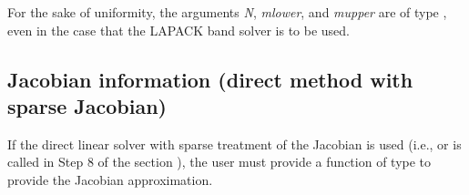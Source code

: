 \documentclass[letterpaper,10pt,english]{sphinxmanual}
\begin{document}
\begin{fulllineitems}
For the sake of uniformity, the arguments \emph{N}, \emph{mlower}, and
\emph{mupper} are of type , even in the case that the
LAPACK band solver is to be used.

\end{fulllineitems}



\subsection{Jacobian information (direct method with sparse Jacobian)}
\label{c_interface/User_supplied:cinterface-sparsejacobianfn}\label{c_interface/User_supplied:jacobian-information-direct-method-with-sparse-jacobian}
If the direct linear solver with sparse treatment of the Jacobian is
used (i.e., {\hyperref[c_interface/User_callable:c.ARKKLU]{\emph{}}} or {\hyperref[c_interface/User_callable:c.ARKSuperLUMT]{\emph{}}} is
called in Step 8 of the section {\hyperref[c_interface/Skeleton:cinterface-skeleton]{\emph{}}}), the user
must provide a function of type {\hyperref[c_interface/User_supplied:c.ARKSlsSparseJacFn]{\emph{}}} to provide
the Jacobian approximation.
\end{document}
